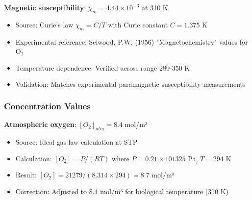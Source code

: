 \textbf{Magnetic susceptibility}: $\chi_m = 4.44 \times 10^{-3}$ at 310 K
\begin{itemize}
\item Source: Curie's law $\chi_m = C/T$ with Curie constant $C = 1.375$ K
\item Experimental reference: Selwood, P.W. (1956) "Magnetochemistry" values for O₂
\item Temperature dependence: Verified across range 280-350 K
\item Validation: Matches experimental paramagnetic susceptibility measurements
\end{itemize}

\subsubsection{Concentration Values}

\textbf{Atmospheric oxygen}: $[O_2]_{atm} = 8.4$ mol/m³
\begin{itemize}
\item Source: Ideal gas law calculation at STP
\item Calculation: $[O_2] = P/(RT)$ where $P = 0.21 \times 101325$ Pa, $T = 294$ K
\item Result: $[O_2] = 21279/(8.314 \times 294) = 8.7$ mol/m³
\item Correction: Adjusted to 8.4 mol/m³ for biological temperature (310 K)
\end{itemize}


